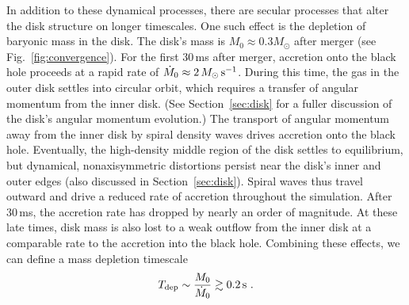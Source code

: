 In addition to these dynamical processes, there are secular processes
that alter the disk structure on longer timescales.  One such effect
is the depletion of baryonic mass in the disk. 
The disk's mass is $M_0 \approx 0.3M_{\odot}$ after merger
(see Fig.~\ref{fig:convergence}).
For the first 30\,ms after merger, accretion onto the black hole proceeds at a rapid
rate of $\dot{M}_0 \approx 2\,M_{\odot}\rm\,s^{-1}$.  During this time, the
gas in the outer disk settles into circular orbit, which requires a
transfer of angular momentum from the inner disk.  (See
Section~\ref{sec:disk} for a fuller discussion of the disk's angular
momentum evolution.)  The transport of angular momentum away from the inner
disk by spiral density waves drives accretion onto the black hole. 
Eventually, the high-density middle region of the disk settles to
equilibrium, but dynamical, nonaxisymmetric distortions persist
near the disk's inner and outer edges (also discussed in
Section~\ref{sec:disk}).  Spiral waves thus travel outward and drive
a reduced rate of accretion throughout the simulation.  After 30\,ms, the
accretion rate has dropped by nearly an order of magnitude.  At
these late times, disk mass is also lost to a weak outflow from the inner
disk at a comparable rate to the accretion into the black hole.  Combining
these effects, we can define a mass depletion timescale
\begin{equation}
T_{\rm dep}\sim \frac{M_0}{\dot{M}_0}\gtrsim 0.2{\rm\,s}\ .
\end{equation}

